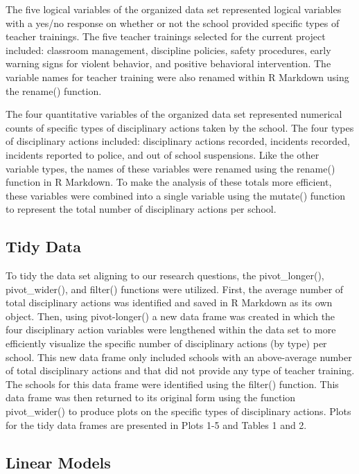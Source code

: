 \documentclass[man]{apa6}
\begin{document}
The five logical variables of the organized data set represented logical variables with a yes/no response on whether or not the school provided specific types of teacher trainings. The five teacher trainings selected for the current project included: classroom management, discipline policies, safety procedures, early warning signs for violent behavior, and positive behavioral intervention. The variable names for teacher training were also renamed within R Markdown using the rename() function.

The four quantitative variables of the organized data set represented numerical counts of specific types of disciplinary actions taken by the school. The four types of disciplinary actions included: disciplinary actions recorded, incidents recorded, incidents reported to police, and out of school suspensions. Like the other variable types, the names of these variables were renamed using the rename() function in R Markdown. To make the analysis of these totals more efficient, these variables were combined into a single variable using the mutate() function to represent the total number of disciplinary actions per school.

\hypertarget{tidy-data}{%
\subsection{Tidy Data}\label{tidy-data}}

To tidy the data set aligning to our research questions, the pivot\_longer(), pivot\_wider(), and filter() functions were utilized. First, the average number of total disciplinary actions was identified and saved in R Markdown as its own object. Then, using pivot-longer() a new data frame was created in which the four disciplinary action variables were lengthened within the data set to more efficiently visualize the specific number of disciplinary actions (by type) per school. This new data frame only included schools with an above-average number of total disciplinary actions and that did not provide any type of teacher training. The schools for this data frame were identified using the filter() function. This data frame was then returned to its original form using the function pivot\_wider() to produce plots on the specific types of disciplinary actions. Plots for the tidy data frames are presented in Plots 1-5 and Tables 1 and 2.

\hypertarget{linear-models}{%
\subsection{Linear Models}\label{linear-models}}
\end{document}
